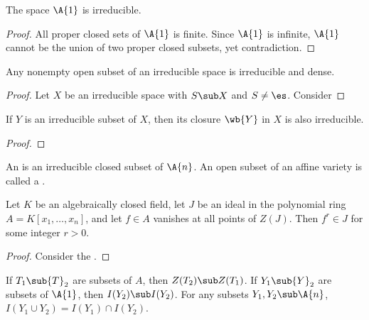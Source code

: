 \documentclass[10pt]{article}
\begin{document}
\begin{example}
    The space $\A{1}$ is irreducible.
\end{example}
\begin{proof}
    All proper closed sets of $\A{1}$ is finite. Since $\A{1}$ is infinite, $\A{1}$ cannot be the union of two proper closed subsets, yet contradiction.
\end{proof}
\begin{example}
    Any nonempty open subset of an irreducible space is irreducible and dense.
\end{example}
\begin{proof}
    Let $X$ be an irreducible space with $S\sub X$ and $S\ne\es$. Consider 
\end{proof}
\begin{example}
    If $Y$ is an irreducible subset of $X$, then its closure $\wb{Y}$ in $X$ is also irreducible.
\end{example}
\begin{proof}
    
\end{proof}
\begin{definition}
    An  is an irreducible closed subset of $\A{n}$. An open subset of an affine variety is called a .
\end{definition}
\begin{remark}
    
\end{remark}
\par




\begin{theorem}
    Let $K$ be an algebraically closed field, let $J$ be an ideal in the polynomial ring $A=K[{x}_{1},\dots,{x}_{n}]$, and let $f\in A$ vanishes at all points of $Z(J)$. Then ${f}^{r}\in J$ for some integer $r>0$.
\end{theorem}
\begin{proof}
    Consider the . 
\end{proof}








\begin{proposition}
    If ${T}_{1}\sub{T}_{2}$ are subsets of $A$, then $Z({T}_{2})\sub Z({T}_{1})$. If ${Y}_{1}\sub{Y}_{2}$ are subsets of $\A{1}$, then $I({Y}_{2})\sub I({Y}_{2})$. For any subsets ${Y}_{1},{Y}_{2}\sub\A{n}$, $I({Y}_{1}\cup{Y}_{2})=I({Y}_{1})\cap I({Y}_{2})$. 
\end{proposition}





\hindex
\end{document}
